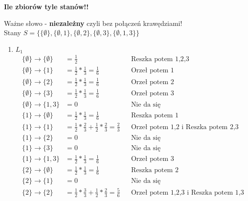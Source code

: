 \begin{enumerate}[label=\alph*)]
\textbf{Ile zbiorów tyle stanów!!}
\begin{figure}[H]
\centering
{}
\end{figure}
Ważne słowo - \textbf{niezależny} czyli bez połączeń krawędziami!\\
Stany $S=\{\{\emptyset\},\{\emptyset,1\},\{\emptyset,2\},\{\emptyset,3\},\{\emptyset,1,3\} \}$
\begin{enumerate}
\item $L_1$
\begin{align*}
\{\emptyset\}\rightarrow \{\emptyset\} &=\frac{1}{2} &&\text{Reszka potem 1,2,3}\\
\{\emptyset\}\rightarrow \{1\} &=\frac{1}{2}*\frac{1}{3}=\frac{1}{6} &&\text{Orzeł potem 1}\\
\{\emptyset\}\rightarrow \{2\} &=\frac{1}{2}*\frac{1}{3}=\frac{1}{6} &&\text{Orzeł potem 2}\\
\{\emptyset\}\rightarrow \{3\} &=\frac{1}{2}*\frac{1}{3}=\frac{1}{6} &&\text{Orzeł potem 3}\\
\{\emptyset\}\rightarrow \{1,3\} &=0 &&\text{Nie da się}\\
\{1\}\rightarrow \{\emptyset\} &= \frac{1}{2}*\frac{1}{3}=\frac{1}{6}&&\text{Reszka potem 1}\\
\{1\}\rightarrow \{1\} &= \frac{1}{2}*\frac{2}{3}+\frac{1}{2}*\frac{2}{3}=\frac{2}{3}&&\text{Orzeł potem 1,2 i Reszka potem 2,3}\\
\{1\}\rightarrow \{2\} &= 0&&\text{Nie da się}\\
\{1\}\rightarrow \{3\} &= 0&&\text{Nie da się}\\
\{1\}\rightarrow \{1,3\} &= \frac{1}{2}*\frac{1}{3}=\frac{1}{6} &&\text{Orzeł potem 3}\\
\{2\}\rightarrow \{\emptyset\} &= \frac{1}{2}*\frac{1}{3}=\frac{1}{6} &&\text{Reszka potem 2}\\
\{2\}\rightarrow \{1\} &= 0&&\text{Nie da się}\\
\{2\}\rightarrow \{2\} &= \frac{1}{2}*\frac{3}{3}+\frac{1}{2}*\frac{2}{3}=\frac{5}{6}&&\text{Orzeł potem 1,2,3 i Reszka potem 1,3}\\

\end{align*}
\end{enumerate}
\end{enumerate}
